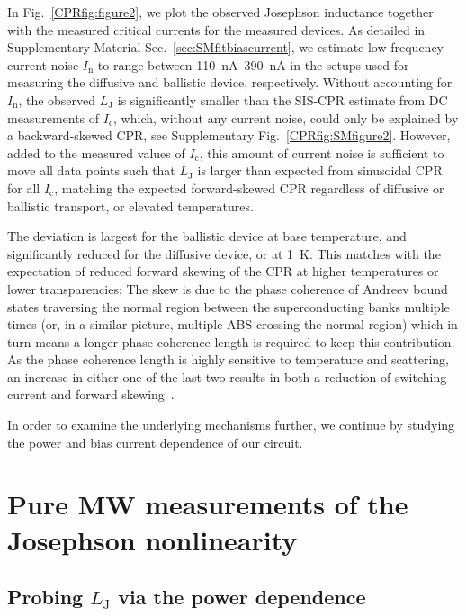 In Fig.~\ref{CPRfig:figure2}, we plot the observed Josephson inductance together with the measured critical currents for the measured devices.
%
As detailed in Supplementary Material Sec.~\ref{sec:SMfitbiascurrent}, we estimate low-frequency current noise $I_\text{n}$ to range between \SIrange{110}{390}{\nano\ampere} in the setups used for measuring the diffusive and ballistic device, respectively.
%
Without accounting for $I_\text{n}$, the observed $L_\text{J}$ is significantly smaller than the SIS-CPR estimate from DC measurements of $I_\text{c}$, which, without any current noise, could only be explained by a backward-skewed CPR, see Supplementary Fig.~\ref{CPRfig:SMfigure2}.
%
However, added to the measured values of $I_\text{c}$, this amount of current noise is sufficient to move all data points such that $L_\text{J}$ is larger than expected from sinusoidal CPR for all $I_\text{c}$, matching the expected forward-skewed CPR regardless of diffusive or ballistic transport, or elevated temperatures.


The deviation is largest for the ballistic device at base temperature, and significantly reduced for the diffusive device, or at \SI{1}{\kelvin}.
%
This matches with the expectation of reduced forward skewing of the CPR at higher temperatures or lower transparencies:
%
The skew is due to the phase coherence of Andreev bound states traversing the normal region between the superconducting banks multiple times (or, in a similar picture, multiple ABS crossing the normal region) which in turn means a longer phase coherence length is required to keep this contribution.
%
As the phase coherence length is highly sensitive to temperature and scattering, an increase in either one of the last two results in both a reduction of switching current and forward skewing~\cite{fuechsleEffectMicrowavesCurrentPhase2009,hagymasiJosephsonCurrentBallistic2010,black-schafferStronglyAnharmonicCurrentphase2010,rakytaMagneticFieldOscillations2016,englishObservationNonsinusoidalCurrentphase2016}.

In order to examine the underlying mechanisms further, we continue by studying the power and bias current dependence of our circuit.



\section{Pure MW measurements of the Josephson nonlinearity}

\subsection{Probing $L_\text{J}$ via the power dependence}

